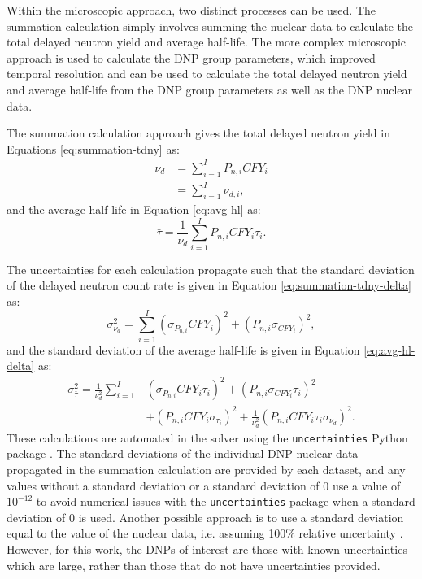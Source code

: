 \documentclass[hidelinks]{style/nseJournal}
\begin{document}
Within the microscopic approach, two distinct processes can be used.
The summation calculation simply involves summing the nuclear data to calculate the total delayed neutron yield and average half-life.
The more complex microscopic approach is used to calculate the \gls{DNP} group parameters, which improved temporal resolution and can be used to calculate the total delayed neutron yield and average half-life from the \gls{DNP} group parameters as well as the \gls{DNP} nuclear data.

The summation calculation approach gives the total delayed neutron yield in Equations \eqref{eq:summation-tdny} as:
\begin{align}
    \nu_d &= \sum_{i=1}^I P_{n,i} CFY_i \\
    &= \sum_{i=1}^I \nu_{d,i},
    \label{eq:summation-tdny}
\end{align}
and the average half-life in Equation \eqref{eq:avg-hl} as:
\begin{equation}
    \bar{\tau} = \frac{1}{\nu_d} \sum_{i=1}^I P_{n,i} CFY_i  \tau_i.
    \label{eq:avg-hl}
\end{equation}

The uncertainties for each calculation propagate such that the standard deviation of the delayed neutron count rate is given in Equation \eqref{eq:summation-tdny-delta} as: 
\begin{equation}
    \sigma_{\nu_d}^2 = \sum_{i=1}^I (\sigma_{P_{n,i}} CFY_i)^2 + (P_{n,i} \sigma_{CFY_i})^2,
    \label{eq:summation-tdny-delta}
\end{equation}
and the standard deviation of the average half-life is given in Equation \eqref{eq:avg-hl-delta} as:
\begin{align}
    \sigma_{\bar{\tau}}^2 = \frac{1}{\nu_d^2} \sum_{i=1}^I& (\sigma_{P_{n,i}} CFY_i \tau_i)^2 + (P_{n,i} \sigma_{CFY_i}  \tau_i)^2 \nonumber \\ 
    &+ (P_{n,i} CFY_i \sigma_{\tau_i})^2 + \frac{1}{\nu_d^2} ( P_{n,i} CFY_i \tau_i \sigma_{\nu_d})^2.
    \label{eq:avg-hl-delta}
\end{align}
These calculations are automated in the solver using the \texttt{uncertainties} Python package \cite{uncertaintiespackage}.
The standard deviations of the individual \gls{DNP} nuclear data propagated in the summation calculation are provided by each dataset, and any values without a standard deviation or a standard deviation of 0 use a value of $10^{-12}$ to avoid numerical issues with the \texttt{uncertainties} package when a standard deviation of 0 is used.
Another possible approach is to use a standard deviation equal to the value of the nuclear data, i.e. assuming 100\% relative uncertainty \cite{foligno_new_2019}.
However, for this work, the \glspl{DNP} of interest are those with known uncertainties which are large, rather than those that do not have uncertainties provided.
\end{document}
